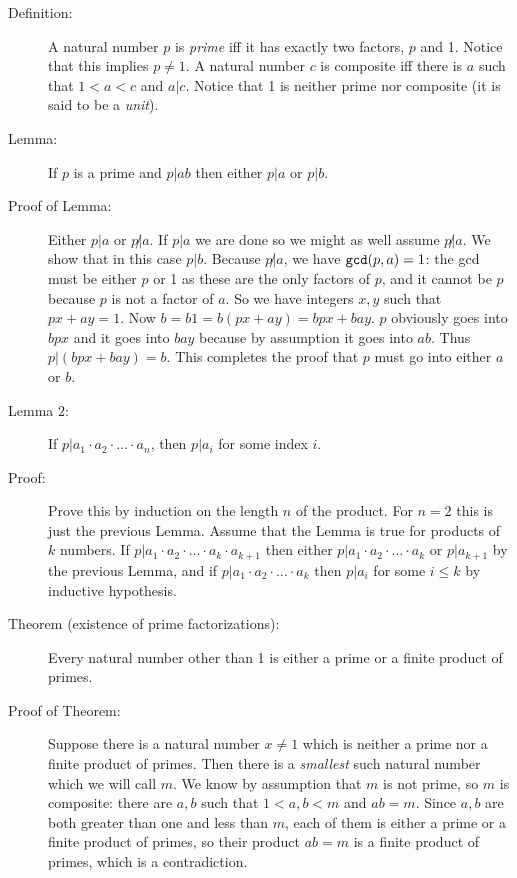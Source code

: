 \documentclass[12pt]{article}
\begin{document}
\begin{description}

\item[Definition:]  A natural number $p$ is {\em prime\/} iff it has exactly two factors, $p$ and 1.  Notice that this implies $p \neq 1$.   A natural number $c$ is composite iff there is $a$ such that $1<a<c$ and $a|c$.  Notice that 1 is neither prime nor composite (it is said to be a {\em unit\/}).

\item[Lemma:]  If $p$ is a prime and $p|ab$ then either $p|a$ or $p|b$.

\item[Proof of Lemma:]  Either $p|a$ or $p \not|a$.  If $p|a$ we are done so we might as well assume
$p \not|a$.  We show that in this case $p|b$.   Because $p \not|a$, we have ${\tt gcd}(p,a)=1$:  the gcd must be either $p$ or 1 as these are the only factors of $p$, and it cannot be $p$ because $p$ is not a factor of $a$.
So we have integers $x,y$ such that $px+ay=1$.  Now $b=b1=b(px+ay)=bpx+bay$.  $p$ obviously goes into $bpx$ and it goes into $bay$ because by assumption it goes into $ab$.  Thus $p|(bpx+bay)=b$.  This completes the proof that $p$ must go into either $a$ or $b$.


\item[Lemma 2:]  If $p|a_1\cdot a_2 \cdot \ldots \cdot a_n$, then $p|a_i$ for some index $i$.

\item[Proof:]  Prove this by induction on the length $n$ of the product.  For $n=2$ this is just the previous
Lemma.   Assume that the Lemma is true for products of $k$ numbers.   If $p| a_1 \cdot a_2 \cdot \ldots \cdot a_k \cdot a_{k+1}$ then either $p|a_1 \cdot a_2 \cdot \ldots \cdot a_k$  or $p|a_{k+1}$ by the previous Lemma,
and if $p|a_1 \cdot a_2 \cdot \ldots \cdot a_k$ then $p|a_i$ for some $i\leq k$ by inductive hypothesis.


\item[Theorem (existence of prime factorizations):]  Every natural number other than 1  is either a prime or a finite product of primes.

\item[Proof of Theorem:]  Suppose there is a natural number $x\neq 1$ which is neither a prime nor a finite product of primes.
Then there is a {\em smallest} such natural number which we will call $m$.  We know by assumption that $m$ is not prime, so $m$ is composite:  there are $a,b$ such that $1<a,b<m$ and $ab=m$.   Since $a,b$ are both greater than one and less than $m$, each of them is either a prime or a finite product of primes, so their product $ab=m$ is
a finite product of primes, which is a contradiction.


\end{description}
\end{document}

